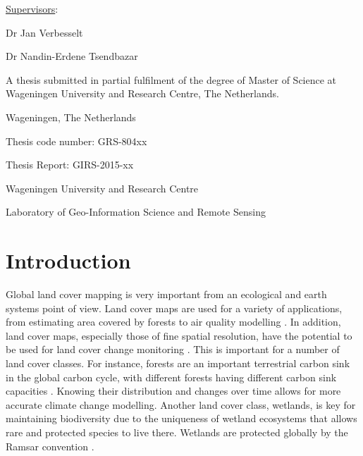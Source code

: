\documentclass[a4paper,12pt]{scrbook}
\begin{document}
\begin{titlingpage}
  {\large \underline{Supervisors}:} \vspace{1.1cm}
  
  {Dr Jan Verbesselt}
  
  {Dr Nandin-Erdene Tsendbazar} \vspace{3.0cm}
  
  {A thesis submitted in partial fulfilment of the degree of Master of Science at Wageningen University and Research Centre, The Netherlands.} \vspace{3.7cm}
  
  \begin{flushright}
    {\thedate}
  
    {Wageningen, The Netherlands}
  \end{flushright} \vspace{0.5cm}

  \begin{flushleft}
    Thesis code number: GRS-804xx
  
    Thesis Report: GIRS-2015-xx
  
    Wageningen University and Research Centre
  
    Laboratory of Geo-Information Science and Remote Sensing 
  \end{flushleft}
\end{titlingpage}

\setcounter{page}{3}

\chapter{Introduction}

Global land cover mapping is very important from an ecological and earth systems point of view. Land cover maps are used for a variety of applications, from estimating area covered by forests \citep{bartalev2014probavboreal} to air quality modelling \citep{wiedinmyer2006airquality}. In addition, land cover maps, especially those of fine spatial resolution, have the potential to be used for land cover change monitoring \citep{defourny2012cci}. This is important for a number of land cover classes. For instance, forests are an important terrestrial carbon sink in the global carbon cycle, with different forests having different carbon sink capacities \citep{pan2011large}. Knowing their distribution and changes over time allows for more accurate climate change modelling. Another land cover class, wetlands, is key for maintaining biodiversity due to the uniqueness of wetland ecosystems that allows rare and protected species to live there. Wetlands are protected globally by the Ramsar convention \citep{davis1994ramsar}.
\end{document}
